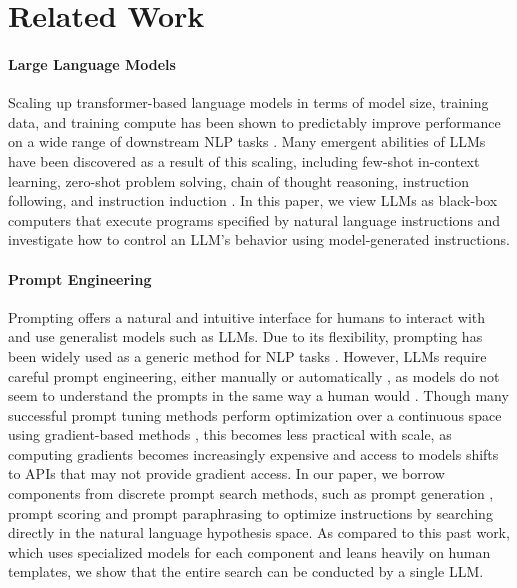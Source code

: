 \section{Related Work}

\paragraph{Large Language Models}
Scaling up transformer-based language models in terms of model size, training data, and training compute has been shown to predictably improve performance on a wide range of downstream NLP tasks \citep{vaswani2017attention, devlin2018bert, brown2020language}. Many emergent abilities \citep{wei2022emergent} of LLMs have been discovered as a result of this scaling, including few-shot in-context learning, zero-shot problem solving, chain of thought reasoning, instruction following, and instruction induction \citep{cobbe2021training, wei2022chain, kojima2022large, sanh2022multitask, wei2021finetuned, ouyang2022training, honovich2022instruction}. In this paper, we view LLMs as black-box computers that execute programs specified by natural language instructions and investigate how to control an LLM's behavior using model-generated instructions. 

\paragraph{Prompt Engineering}
Prompting offers a natural and intuitive interface for humans to interact with and use generalist models such as LLMs. Due to its flexibility, prompting has been widely used as a generic method for NLP tasks \citep{schick2021exploiting, brown2020language, sanh2022multitask}. However, LLMs require careful prompt engineering, either manually \citep{reynolds2021prompt} or automatically \citep{gao2021making, shin2020autoprompt}, as models do not seem to understand the prompts in the same way a human would \citep{webson2021prompt, lu2021fantastically}. Though many successful prompt tuning methods perform optimization over a continuous space using gradient-based methods \citep{liu2021gpt, qin2021learning,lester2021power}, this becomes less practical with scale, as computing gradients becomes increasingly expensive and access to models shifts to APIs that may not provide gradient access. 
In our paper, we borrow components from discrete prompt search methods, such as prompt generation \citep{gao2021making, ben2021pada}, prompt scoring \citep{davison2019commonsense} and prompt paraphrasing \citep{jiang2020can, yuan2021bartscore} to optimize instructions by searching directly in the natural language hypothesis space. 
As compared to this past work, which uses specialized models for each component and leans heavily on human templates, we show that the entire search can be conducted by a single LLM.

